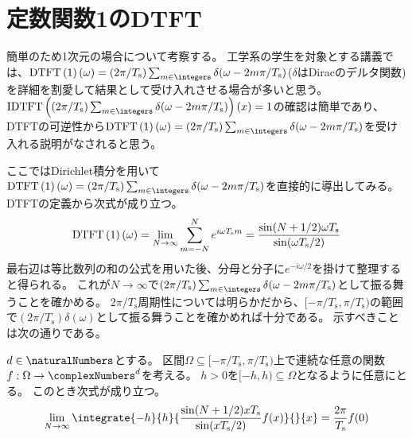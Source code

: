 		\section{定数関数1のDTFT}
			\label{定数関数1のDTFT}
			簡単のため1次元の場合について考察する。
			工学系の学生を対象とする講義では、$\DTFTwithArg{1}{\omega} = (2\pi/T_\text{s})\sum_{m\in\integers}\delta(\omega-2m\pi/T_\text{s})$($\delta$はDiracのデルタ関数)を詳細を割愛して結果として受け入れさせる場合が多いと思う。
			$\IDTFTwithArg{(2\pi/T_\text{s})\sum_{m\in\integers}\delta(\omega-2m\pi/T_\text{s})}{x}=1$の確認は簡単であり、DTFTの可逆性から$\DTFTwithArg{1}{\omega} = (2\pi/T_\text{s})\sum_{m\in\integers}\delta(\omega-2m\pi/T_\text{s})$を受け入れる説明がなされると思う。
			\par
			ここではDirichlet積分を用いて$\DTFTwithArg{1}{\omega} = (2\pi/T_\text{s})\sum_{m\in\integers}\delta(\omega-2m\pi/T_\text{s})$を直接的に導出してみる。
			DTFTの定義から次式が成り立つ。
			\[
				\mathrm{DTFT}\left(1\right)\left(\omega\right) = \lim_{N\to\infty} \sum_{m=-N}^N e^{i\omega T_\text{s} m} = \frac{\sin(N+1/2)\omega T_\text{s}}{\sin(\omega T_\text{s}/2)}
			\]
			最右辺は等比数列の和の公式を用いた後、分母と分子に$e^{-i\omega/2}$を掛けて整理すると得られる。
			これが$N\to\infty$で$(2\pi/T_\text{s})\sum_{m\in\integers}\delta(\omega-2m\pi/T_\text{s})$として振る舞うことを確かめる。
			$2\pi/T_\text{s}$周期性については明らかだから、$[-\pi/T_\text{s},\pi/T_\text{s})$の範囲で$(2\pi/T_\text{s})\delta(\omega)$として振る舞うことを確かめれば十分である。
			示すべきことは次の通りである。
			\begin{shadebox}
				$d\in\naturalNumbers$とする。
				区間$\Omega \subseteq [-\pi/T_\text{s},\pi/T_\text{s})$上で連続な任意の関数$f:\Omega\to\complexNumbers^d$を考える。
				$h>0$を$[-h,h) \subseteq \Omega$となるように任意にとる。
				このとき次式が成り立つ。
				\[
					\lim_{N\to\infty} \integrate{-h}{h}{\frac{\sin(N+1/2)x T_\text{s}}{\sin(x T_\text{s}/2)} f(x)}{}{x} = \frac{2\pi}{T_\text{s}} f(0)
				\]
			\end{shadebox}
